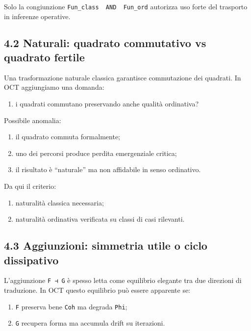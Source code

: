 Solo la congiunzione \texttt{Fun\_class\ \ AND\ \ Fun\_ord} autorizza uso forte del trasporto in inferenze operative.

\subsection{4.2 Naturali: quadrato commutativo vs quadrato fertile}

Una trasformazione naturale classica garantisce commutazione dei quadrati. In OCT aggiungiamo una domanda:

\begin{enumerate}
\def\labelenumi{\arabic{enumi}.}
\tightlist
\item
  i quadrati commutano preservando anche qualità ordinativa?
\end{enumerate}

Possibile anomalia:

\begin{enumerate}
\def\labelenumi{\arabic{enumi}.}
\tightlist
\item
  il quadrato commuta formalmente;
\item
  uno dei percorsi produce perdita emergenziale critica;
\item
  il risultato è ``naturale'' ma non affidabile in senso ordinativo.
\end{enumerate}

Da qui il criterio:

\begin{enumerate}
\def\labelenumi{\arabic{enumi}.}
\tightlist
\item
  naturalità classica necessaria;
\item
  naturalità ordinativa verificata su classi di casi rilevanti.
\end{enumerate}

\subsection{4.3 Aggiunzioni: simmetria utile o ciclo dissipativo}

L'aggiunzione \texttt{F\ ⊣\ G} è spesso letta come equilibrio elegante tra due direzioni di traduzione. In OCT questo equilibrio può essere apparente se:

\begin{enumerate}
\def\labelenumi{\arabic{enumi}.}
\tightlist
\item
  \texttt{F} preserva bene \texttt{Coh} ma degrada \texttt{Phi};
\item
  \texttt{G} recupera forma ma accumula drift su iterazioni.
\end{enumerate}

